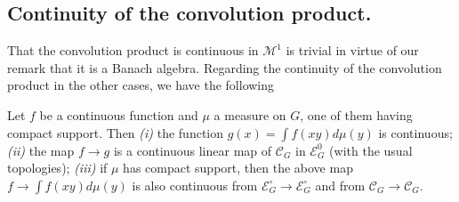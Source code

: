 \subsection{Continuity of the convolution
  product.}\label{partII-chap2-sec2.3}%

That the convolution product is continuous in $\mathscr{M}^1$ is trivial in
virtue of our remark that it is a Banach algebra. Regarding the
continuity of the convolution product in the other cases, we have the
following  

\setcounter{lem}{0}
\begin{lem}\label{partII-chap2-lem1}%
 Let $f$ be a continuous function and $\mu$ a measure on $G$, one of
 them having compact support. Then {\em(i)} the function $g(x) =\int f
 (xy) d \mu (y)$ is continuous; {\em(ii)} the map $f\rightarrow g$ is a
 continuous linear map of $\mathscr{C}_G$ in\pageoriginale 
$\mathscr{E}^{0}_{G} $ (with the
 usual topologies); {\em(iii)} if $ \mu $ has compact support, then the
 above map $f  \rightarrow \int f (xy) d\mu (y)$ is also continuous
 from $\mathscr{E}_G^\circ \rightarrow\mathscr{E}_G^\circ$ and from $\mathscr{C}_G
 \rightarrow \mathscr{C}_G$. 
\end{lem}

